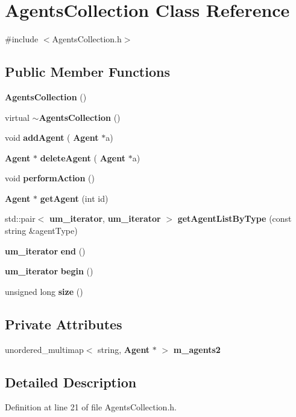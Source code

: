 \section{Agents\+Collection Class Reference}
\label{class_agents_collection}


{\ttfamily \#include $<$Agents\+Collection.\+h$>$}

\subsection*{Public Member Functions}
\begin{DoxyCompactItemize}
\item 
\textbf{ Agents\+Collection} ()
\item 
virtual \textbf{ $\sim$\+Agents\+Collection} ()
\item 
void \textbf{ add\+Agent} (\textbf{ Agent} $\ast$a)
\item 
\textbf{ Agent} $\ast$ \textbf{ delete\+Agent} (\textbf{ Agent} $\ast$a)
\item 
void \textbf{ perform\+Action} ()
\item 
\textbf{ Agent} $\ast$ \textbf{ get\+Agent} (int id)
\item 
std\+::pair$<$ \textbf{ um\+\_\+iterator}, \textbf{ um\+\_\+iterator} $>$ \textbf{ get\+Agent\+List\+By\+Type} (const string \&agent\+Type)
\item 
\textbf{ um\+\_\+iterator} \textbf{ end} ()
\item 
\textbf{ um\+\_\+iterator} \textbf{ begin} ()
\item 
unsigned long \textbf{ size} ()
\end{DoxyCompactItemize}
\subsection*{Private Attributes}
\begin{DoxyCompactItemize}
\item 
unordered\+\_\+multimap$<$ string, \textbf{ Agent} $\ast$ $>$ \textbf{ m\+\_\+agents2}
\end{DoxyCompactItemize}


\subsection{Detailed Description}


Definition at line 21 of file Agents\+Collection.\+h.



